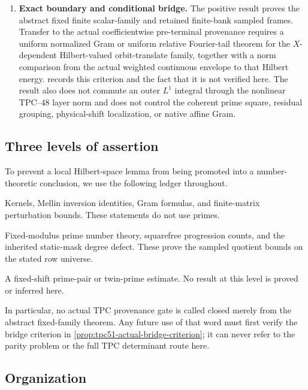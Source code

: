\begin{enumerate}[label=\textup{(R\arabic*)},leftmargin=3.2em]
 \item \textbf{Exact boundary and conditional bridge.}
 The positive result proves the abstract fixed finite scalar-family and
 retained finite-bank sampled frames.  Transfer to the actual
 coefficientwise pre-terminal provenance requires a uniform normalized
 Gram or uniform relative Fourier-tail theorem for the
 \(X\)-dependent Hilbert-valued orbit-translate family, together with a
 norm comparison from the actual weighted continuous envelope to that
 Hilbert energy.   records this
 criterion and the fact that it is not verified here.  The result also
 does not commute an outer \(L^1\) integral through the nonlinear
 TPC--48 layer norm and does not control the coherent prime square,
 residual grouping, physical-shift localization, or native affine
 Gram.
\end{enumerate}

\subsection{Three levels of assertion}

To prevent a local Hilbert-space lemma from being promoted into a
number-theoretic conclusion, we use the following ledger throughout.

\begin{description}[style=nextline,leftmargin=2.2em]
 \item[Level L0: exact algebra/analysis.]
 Kernels, Mellin inversion identities, Gram formulas, and finite-matrix
 perturbation bounds.  These statements do not use primes.
 \item[Level L1: arithmetic interface.]
 Fixed-modulus prime number theory, squarefree progression counts, and
 the inherited static-mask degree defect.  These prove the sampled
 quotient bounds on the stated row universe.
 \item[Level L2: target correlation.]
 A fixed-shift prime-pair or twin-prime estimate.  No result at this
 level is proved or inferred here.
\end{description}

In particular, no actual TPC provenance gate is called closed merely
from the abstract fixed-family theorem.  Any future use of that word
must first verify the bridge criterion in
\cref{prop:tpc51-actual-bridge-criterion}; it can never refer to the
parity problem or the full TPC determinant route here.

\subsection{Organization}

